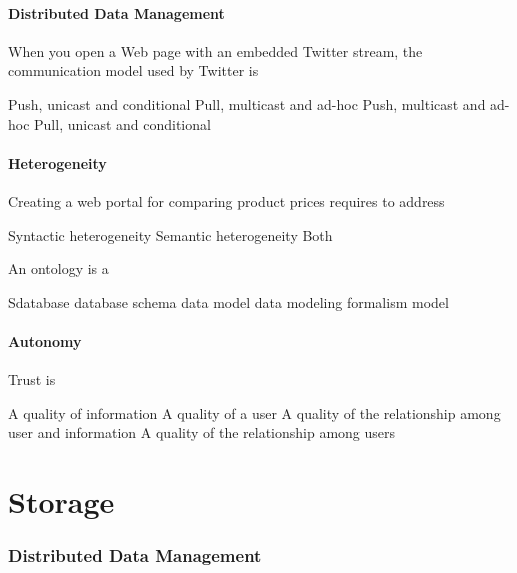 \documentclass[12pt,a4paper,answers]{exam} %
\begin{document}
\begin{flushleft}
\begin{multicols*}{2}
\begin{questions}
\subsection{Distributed Data Management}

\question When you open a Web page with an embedded Twitter stream, the communication model used by Twitter is
\begin{checkboxes}
\choice Push, unicast and conditional
\choice Pull, multicast and ad-hoc
\choice Push, multicast and ad-hoc
\choice Pull, unicast and conditional
\end{checkboxes}


\subsection{Heterogeneity}

\question Creating a web portal for comparing product prices requires to address
\begin{checkboxes}
\choice Syntactic heterogeneity
\choice Semantic heterogeneity
\choice Both
\end{checkboxes}

\question An ontology is a
\begin{checkboxes}
\choice Sdatabase
\choice database schema
\choice data model
\choice data modeling formalism
\choice model
\end{checkboxes}


\subsection{Autonomy}

\question Trust is
\begin{checkboxes}
\choice A quality of information
\choice A quality of a user
\choice A quality of the relationship among user and information
\choice A quality of the relationship among users
\end{checkboxes}



\part{Storage}
\section{Distributed Data Management}


\end{questions}
\end{multicols*}
\end{flushleft}
\end{document}
